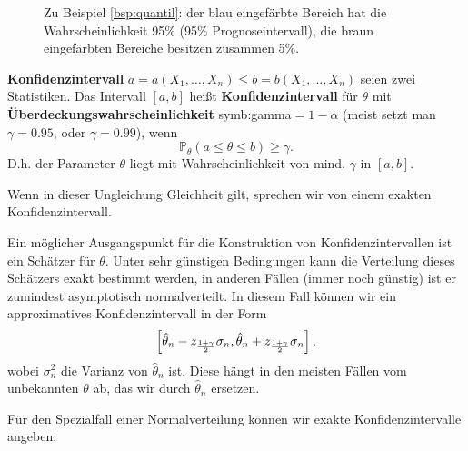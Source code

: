 \begin{figure}
    \centering
    \begin{tikzpicture}
    \end{tikzpicture}
    \caption{Zu Beispiel \ref{bsp:quantil}: der blau eingefärbte Bereich hat die Wahrscheinlichkeit 95\% (95\% Prognoseintervall), die braun eingefärbten Bereiche besitzen zusammen 5\%.}
    \label{fig:quantil}
\end{figure}

\begin{definition} \textbf{Konfidenzintervall}\label{def:konfidenzintervall}
$a=a(X_1,\dots,X_n)\le b=b(X_1,\dots,X_n)$ seien zwei Statistiken. Das
Intervall
$[a,b]$ heißt \textbf{Konfidenzintervall} für $\theta$ mit \textbf{Überdeckungswahrscheinlichkeit} \gls{symb:gamma}$=1-\alpha$ (meist setzt man $\gamma=0.95$, oder $\gamma=0.99$), wenn
\[\mathbb P_\theta(a\le \theta \le b)\ge\gamma.\]
D.h. der Parameter $\theta$ liegt mit Wahrscheinlichkeit von mind. $\gamma$ in $[a,b]$.

Wenn in dieser Ungleichung Gleichheit gilt, sprechen wir von einem
exakten Konfidenzintervall.
\end{definition}



Ein möglicher Ausgangspunkt für die Konstruktion von Konfidenzintervallen
 ist ein Schätzer für $\theta$. Unter sehr günstigen Bedingungen
kann die Verteilung dieses Schätzers exakt bestimmt werden, in anderen
Fällen (immer noch günstig) ist er zumindest asymptotisch
normalverteilt. In diesem Fall können wir ein approximatives Konfidenzintervall in der Form
\[\left[\hat\theta_n-z_{1+\gamma\over 2}\sigma_n,
\hat\theta_n+z_{1+\gamma\over 2}\sigma_n\right],\]
wobei $\sigma_n^2$ die Varianz von $\hat\theta_n$ ist.
Diese hängt in den meisten Fällen vom unbekannten $\theta$ ab, das wir
durch $\hat\theta_n$ ersetzen.

\ifdefined\uebsps

\fi

Für den Spezialfall einer Normalverteilung können wir exakte
Konfidenzintervalle angeben:

